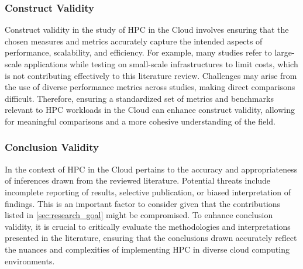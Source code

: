 \subsubsection{Construct Validity}
Construct validity in the study of HPC in the Cloud involves ensuring that the chosen measures and metrics accurately capture the intended aspects of performance, scalability, and efficiency. For example, many studies refer to large-scale applications while testing on small-scale infrastructures to limit costs, which is not contributing effectively to this literature review. Challenges may arise from the use of diverse performance metrics across studies, making direct comparisons difficult. Therefore, ensuring a standardized set of metrics and benchmarks relevant to HPC workloads in the Cloud can enhance construct validity, allowing for meaningful comparisons and a more cohesive understanding of the field.

\subsubsection{Conclusion Validity}
In the context of HPC in the Cloud pertains to the accuracy and appropriateness of inferences drawn from the reviewed literature. Potential threats include incomplete reporting of results, selective publication, or biased interpretation of findings. This is an important factor to consider given that the contributions listed in \autoref{sec:research_goal} might be compromised. To enhance conclusion validity, it is crucial to critically evaluate the methodologies and interpretations presented in the literature, ensuring that the conclusions drawn accurately reflect the nuances and complexities of implementing HPC in diverse cloud computing environments.
